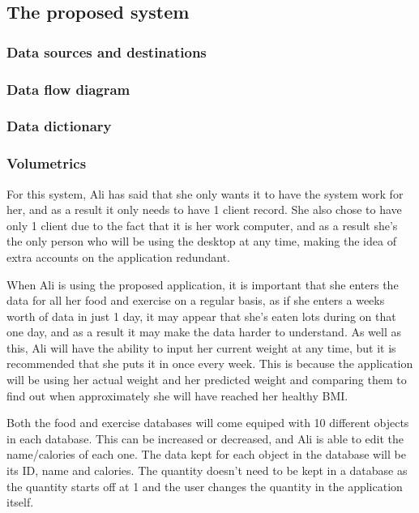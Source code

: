 \subsection{The proposed system}

\subsubsection{Data sources and destinations}

\subsubsection{Data flow diagram}

\subsubsection{Data dictionary}

\subsubsection{Volumetrics}
For this system, Ali has said that she only wants it to have the system work for her, and as a result it only needs to have 1 client record. She also chose to have only 1 client due to the fact that it is her work computer, and as a result she's the only person who will be using the desktop at any time, making the idea of extra accounts on the application redundant.

When Ali is using the proposed application, it is important that she enters the data for all her food and exercise on a regular basis, as if she enters a weeks worth of data in just 1 day, it may appear that she's eaten lots during on that one day, and as a result it may make the data harder to understand. As well as this, Ali will have the ability to input her current weight at any time, but it is recommended that she puts it in once every week. This is because the application will be using her actual weight and her predicted weight and comparing them to find out when approximately she will have reached her healthy BMI.

Both the food and exercise databases will come equiped with 10 different objects in each database. This can be increased or decreased, and Ali is able to edit the name/calories of each one. The data kept for each object in the database will be its ID, name and calories. The quantity doesn't need to be kept in a database as the quantity starts off at 1 and the user changes the quantity in the application itself.

